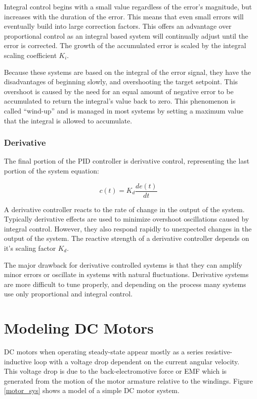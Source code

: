 \documentclass[openany,11pt,fleqn]{book} %
\begin{document}
Integral control begins with a small value regardless of the error's magnitude, but increases with the duration of the error. This means that even small errors will eventually build into large correction factors. This offers an advantage over proportional control as an integral based system will continually adjust until the error is corrected. The growth of the accumulated error is scaled by the integral scaling coefficient $ K_{i}$.

Because these systems are based on the integral of the error signal, they have the disadvantages of beginning slowly, and overshooting the target setpoint. This overshoot is caused by the need for an equal amount of negative error to be accumulated to return the integral's value back to zero. This phenomenon is called ``wind-up'' and is managed in most systems by setting a maximum value that the integral is allowed to accumulate. 

\subsubsection{\color{orange}Derivative}
The final portion of the PID controller is derivative control, representing the last portion of the system equation:

\begin{equation*}
c(t) = K_{d}\frac{de(t)}{dt}
\end{equation*} 

A derivative controller reacts to the rate of change in the output of the system. Typically derivative effects are used to minimize overshoot oscillations caused by integral control. However, they also respond rapidly to unexpected changes in the output of the system. The reactive strength of a derivative controller depends on it's scaling factor $K_{d}$.

The major drawback for derivative controlled systems is that they can amplify minor errors or oscillate in systems with natural fluctuations. Derivative systems are more difficult to tune properly, and depending on the process many systems use only proportional and integral control. 

\section{Modeling DC Motors}

DC motors when operating steady-state appear mostly as a series resistive-inductive loop with a voltage drop dependent on the current angular velocity. This voltage drop is due to the back-electromotive force or EMF which is generated from the motion of the motor armature relative to the windings. Figure \ref{motor_sys} shows a model of a simple DC motor system. 
\end{document}
